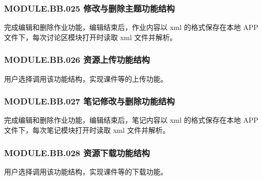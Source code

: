 \subsubsection{MODULE.BB.025    修改与删除主题功能结构}
完成编辑和删除作业功能，编辑结束后，作业内容以 xml 的格式保存在本地 APP 文件下，每次讨论区模块打开时读取 xml 文件并解析。

\subsubsection{MODULE.BB.026    资源上传功能结构}
用户选择调用该功能结构，实现课件等的上传功能。

\subsubsection{MODULE.BB.027    笔记修改与删除功能结构}
完成编辑和删除作业功能，编辑结束后，笔记内容以 xml 的格式保存在本地 APP 文件下，每次笔记模块打开时读取 xml 文件并解析。

\subsubsection{MODULE.BB.028    资源下载功能结构}
用户选择调用该功能结构，实现课件等的下载功能。


